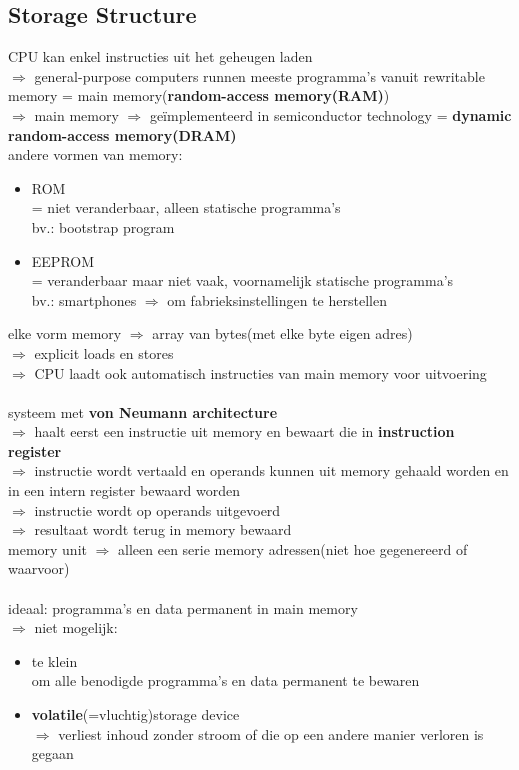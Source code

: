 \documentclass{report}
\begin{document}
\subsection{Storage Structure}
CPU kan enkel instructies uit het geheugen laden
\\$\Rightarrow$ general-purpose computers runnen meeste programma's vanuit rewritable memory = main memory(\textbf{random-access memory(RAM)})
\\$\Rightarrow$ main memory $\Rightarrow$ ge\"implementeerd in semiconductor technology = \textbf{dynamic random-access memory(DRAM)}
\\andere vormen van memory:
\begin{itemize}
\item ROM
\\ = niet veranderbaar, alleen statische programma's
\\bv.: bootstrap program
\item EEPROM
\\ = veranderbaar maar niet vaak, voornamelijk statische programma's
\\bv.: smartphones $\Rightarrow$ om fabrieksinstellingen te herstellen
\end{itemize}
elke vorm memory $\Rightarrow$ array van bytes(met elke byte eigen adres)
\\$\Rightarrow$ explicit loads en stores
\\$\Rightarrow$ CPU laadt ook automatisch instructies van main memory voor uitvoering
\\
\\ systeem met \textbf{von Neumann architecture}
\\$\Rightarrow$ haalt eerst een instructie uit memory en bewaart die in \textbf{instruction register}
\\$\Rightarrow$ instructie wordt vertaald en operands kunnen uit memory gehaald worden en in een intern register bewaard worden
\\$\Rightarrow$ instructie wordt op operands uitgevoerd
\\$\Rightarrow$ resultaat wordt terug in memory bewaard
\\memory unit $\Rightarrow$ alleen een serie memory adressen(niet hoe gegenereerd of waarvoor)
\\
\\ideaal: programma's en data permanent in main memory
\\ $\Rightarrow$ niet mogelijk:
\begin{itemize}
\item te klein
\\ om alle benodigde programma's en data permanent te bewaren
\item \textbf{volatile}(=vluchtig)storage device
\\$\Rightarrow$ verliest inhoud zonder stroom of die op een andere manier verloren is gegaan
\end{itemize}
\end{document}
